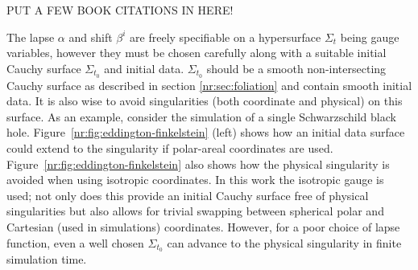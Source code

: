 \color{gren} PUT A FEW BOOK CITATIONS IN HERE! \color{black}

The lapse $\alpha$ and shift $\beta^i$ are freely specifiable on a hypersurface $\Sigma_t$ being gauge variables, however they must be chosen carefully along with a suitable initial Cauchy surface $\Sigma_{t_0}$ and initial data. $\Sigma_{t_0}$ should be a smooth non-intersecting Cauchy surface as described in section \ref{nr:sec:foliation} and contain smooth initial data. It is also wise to avoid singularities (both coordinate and physical) on this surface. As an example, consider the simulation of a single Schwarzschild black hole. Figure~\ref{nr:fig:eddington-finkelstein} (left) shows how an initial data surface could extend to the singularity if polar-areal coordinates are used. Figure~\ref{nr:fig:eddington-finkelstein} also shows how the physical singularity is avoided when using isotropic coordinates. In this work the isotropic gauge is used; not only does this provide an initial Cauchy surface free of physical singularities but also allows for trivial swapping between spherical polar and Cartesian (used in simulations) coordinates. However, for a poor choice of lapse function, even a well chosen $\Sigma_{t_0}$ can advance to the physical singularity in finite simulation time. 


